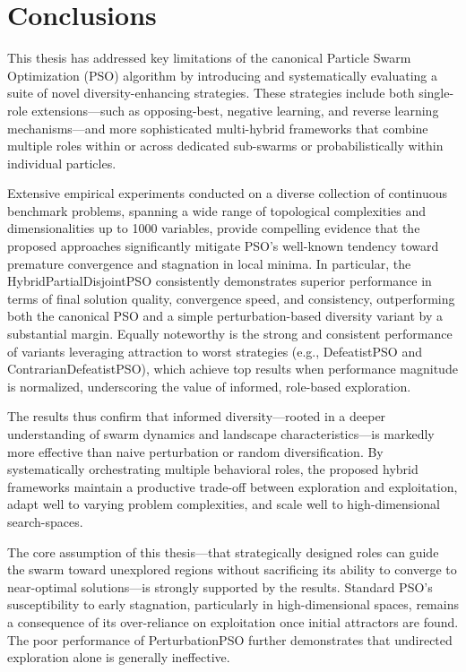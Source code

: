\chapter[Conclusions]{Conclusions}
\label{cp:conclusions}


This thesis has addressed key limitations of the canonical Particle Swarm Optimization (PSO) algorithm by introducing and systematically evaluating a suite of novel diversity-enhancing strategies. These strategies include both single-role extensions---such as opposing-best, negative learning, and reverse learning mechanisms---and more sophisticated multi-hybrid frameworks that combine multiple roles within or across dedicated sub-swarms or probabilistically within individual particles.

Extensive empirical experiments conducted on a diverse collection of continuous benchmark problems, spanning a wide range of topological complexities and dimensionalities up to 1000 variables, provide compelling evidence that the proposed approaches significantly mitigate PSO’s well-known tendency toward premature convergence and stagnation in local minima. In particular, the HybridPartialDisjointPSO consistently demonstrates superior performance in terms of final solution quality, convergence speed, and consistency, outperforming both the canonical PSO and a simple perturbation-based diversity variant by a substantial margin. Equally noteworthy is the strong and consistent performance of variants leveraging attraction to worst strategies (e.g., DefeatistPSO and ContrarianDefeatistPSO), which achieve top results when performance magnitude is normalized, underscoring the value of informed, role-based exploration.

The results thus confirm that informed diversity---rooted in a deeper understanding of swarm dynamics and landscape characteristics---is markedly more effective than naive perturbation or random diversification.
By systematically orchestrating multiple behavioral roles, the proposed hybrid frameworks maintain a productive trade-off between exploration and exploitation, adapt well to varying problem complexities, and scale well to high-dimensional \glspl{search-space}.

The core assumption of this thesis---that strategically designed roles can guide the swarm toward unexplored regions without sacrificing its ability to converge to near-optimal solutions---is strongly supported by the results. Standard PSO’s susceptibility to early stagnation, particularly in high-dimensional spaces, remains a consequence of its over-reliance on exploitation once initial attractors are found. The poor performance of PerturbationPSO further demonstrates that undirected exploration alone is generally ineffective.

